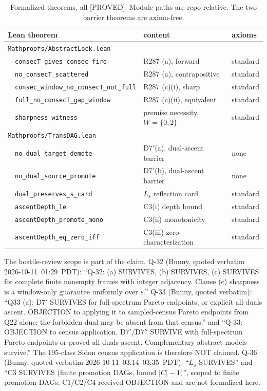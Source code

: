\documentclass[11pt,a4paper]{article}
\theoremstyle{definition}
\begin{document}
\begin{table}[t]
  \centering
  \caption{Formalized theorems, all [PROVED]. Module paths are
    repo-relative. The two barrier theorems are axiom-free.}
  \label{tab:formalization}
  \begin{tabular}{lll}
    \toprule
    Lean theorem & content & axioms \\
    \midrule
    \multicolumn{3}{l}{\texttt{Mathproofs/AbstractLock.lean}} \\
    \ \ \texttt{consecT\_gives\_consec\_fire} & R287 (a), forward
      & standard \\
    \ \ \texttt{no\_consecT\_scattered} & R287 (a), contrapositive
      & standard \\
    \ \ \texttt{consec\_window\_no\_consecT\_not\_full} & R287 (c)(i),
      sharp & standard \\
    \ \ \texttt{full\_no\_consecT\_gap\_window} & R287 (c)(ii),
      equivalent & standard \\
    \ \ \texttt{sharpness\_witness} & premise necessity, $W=\{0,2\}$
      & standard \\
    \multicolumn{3}{l}{\texttt{Mathproofs/TransDAG.lean}} \\
    \ \ \texttt{no\_dual\_target\_demote} & D7$'$(a), dual-ascent barrier
      & none \\
    \ \ \texttt{no\_dual\_source\_promote} & D7$'$(b), dual-ascent barrier
      & none \\
    \ \ \texttt{dual\_preserves\_s\_card} & $L_s$ reflection card & standard \\
    \ \ \texttt{ascentDepth\_le} & C3(i) depth bound & standard \\
    \ \ \texttt{ascentDepth\_promote\_mono} & C3(ii) monotonicity
      & standard \\
    \ \ \texttt{ascentDepth\_eq\_zero\_iff} & C3(iii) zero characterization
      & standard \\
    \bottomrule
  \end{tabular}
\end{table}

The hostile-review scope is part of the claim. Q-32 (Bunny, quoted
verbatim 2026-10-11~01:29~PDT): ``Q-32: (a) SURVIVES, (b) SURVIVES,
(c) SURVIVES for complete finite nonempty frames with integer
adjacency. Clause (c) sharpness is a window-only guarantee uniformly
over $\varepsilon$.'' Q-33 (Bunny, quoted verbatim): ``Q33 (a): D7$'$
SURVIVES for full-spectrum Pareto endpoints, or explicit all-duals
ascent. OBJECTION to applying it to sampled-census Pareto endpoints
from Q22 alone: the forbidden dual may be absent from that census.''
and ``Q-33: OBJECTION to census application. D7$'$/D7$''$ SURVIVE with
full-spectrum Pareto endpoints or proved all-duals ascent.
Complementary abstract models survive.'' The $195$-class Sidon census
application is therefore NOT claimed. Q-36 (Bunny, quoted verbatim
2026-10-11~03:14--03:35~PDT): ``$L_s$ SURVIVES'' and ``C3 SURVIVES
(finite promotion DAGs, bound $|C|-1)$'', scoped to finite promotion
DAGs; C1/C2/C4 received OBJECTION and are not formalized here.
\end{document}
